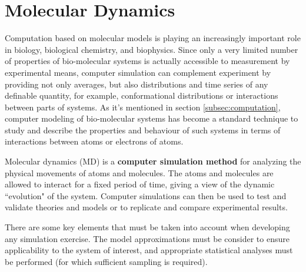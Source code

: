 \section{Molecular Dynamics}\label{sec:MD}

\vspace{3cm}
\par

Computation based on molecular models is playing an increasingly important role in biology, biological chemistry, and biophysics. Since only a very limited number of properties of bio-molecular systems is actually accessible to measurement by experimental means, computer simulation can complement experiment by providing not only averages, but also distributions and time series of any definable quantity, for example, conformational distributions or interactions between parts of systems. As it's mentioned in section \ref{subsec:computation}, computer modeling of bio-molecular systems has become a standard technique to study and describe the properties and behaviour of such systems in terms of interactions between atoms or electrons of atoms.

Molecular dynamics (MD) is a \textbf{computer simulation method} for analyzing the physical movements of atoms and molecules. The atoms and molecules are allowed to interact for a fixed period of time, giving a view of the dynamic ``evolution" of the system. Computer simulations can then be used to test and validate theories and models or to replicate and compare experimental results.

There are some key elements that must be taken into account when developing any simulation exercise. The model approximations must be consider to ensure applicability to the system of interest, and appropriate statistical analyses must be performed (for which sufficient sampling is required).

